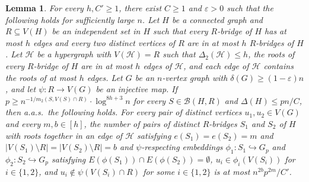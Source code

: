 \documentclass[11pt]{article}
\numberwithin{equation}{section}
\newcounter{i}
\theoremstyle{plain}
\newtheorem{lem}[thm]{Lemma}
\theoremstyle{plain} %
\theoremstyle{definition}
\newcommand{\cB}{\mathcal{B}}
\newcommand{\cH}{\mathcal{H}}
\newcommand{\aas}{a.a.s.\ }
\begin{document}
\begin{lem}\label{lem:configuration-degree-bound}
    For every $h, C'\ge 1$, there exist $C\ge 1$ and $\varepsilon > 0$ such that the following holds for sufficiently large $n$. Let $H$ be a connected graph and $R\subseteq V(H)$ be an independent set in $H$ such that every $R$-bridge of $H$ has at most $h$ edges and every two distinct vertices of $R$ are in at most $h$ $R$-bridges of $H$. 
    Let $\cH$ be a hypergraph with $V(\cH) = R$ such that $\Delta_2(\cH) \leq h$, the roots of every $R$-bridge of $H$ are in at most $h$ edges of $\cH$, and each edge of $\cH$ contains the roots of at most $h$ edges. 
    Let $G$ be an $n$-vertex graph with $\delta(G) \ge (1-\varepsilon)n$, and let $\psi : R \rightarrow V(G)$ be an injective map.     
    If $p \geq n^{-1/m_2(S,V(S) \cap R)} \cdot \log^{8h+3} n$ for every $S \in \cB(H, R)$ and $\Delta(H)\le {pn}/{C}$, then \aas the following holds.
    For every pair of distinct vertices $u_1, u_2 \in V(G)$ and every $m,b \in [h]$, the number of pairs of distinct $R$-bridges $S_1$ and $S_2$ of $H$ with roots together in an edge of $\cH$ satisfying $e(S_1) = e(S_2) = m$ and $|V(S_1) \setminus R| = |V(S_2) \setminus R| = b$ and $\psi$-respecting embeddings $\phi_1 : S_1 \hookrightarrow G_p$ and $\phi_2 : S_2 \hookrightarrow G_p$ satisfying 
    $E(\phi(S_1)) \cap E(\phi(S_2)) = \emptyset$, $u_i \in \phi_i(V(S_i))$ for $i \in\{1,2\}$, and $u_i \notin \psi (V(S_i)\cap R)$ for some $i \in \{1,2\}$ is at most $n^{2b}p^{2m} / C'$.
\end{lem}
\end{document}
